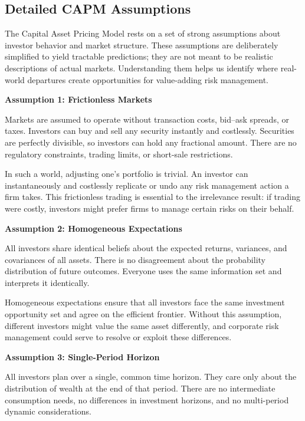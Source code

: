 \documentclass[11pt,openany]{book}
\begin{document}
\subsection{Detailed CAPM Assumptions}\label{detailed-capm-assumptions}

The Capital Asset Pricing Model rests on a set of strong assumptions about investor behavior and market structure. These assumptions are deliberately simplified to yield tractable predictions; they are not meant to be realistic descriptions of actual markets. Understanding them helps us identify where real-world departures create opportunities for value-adding risk management.

\textbf{Assumption 1: Frictionless Markets}

Markets are assumed to operate without transaction costs, bid--ask spreads, or taxes. Investors can buy and sell any security instantly and costlessly. Securities are perfectly divisible, so investors can hold any fractional amount. There are no regulatory constraints, trading limits, or short-sale restrictions.

In such a world, adjusting one's portfolio is trivial. An investor can instantaneously and costlessly replicate or undo any risk management action a firm takes. This frictionless trading is essential to the irrelevance result: if trading were costly, investors might prefer firms to manage certain risks on their behalf.

\textbf{Assumption 2: Homogeneous Expectations}

All investors share identical beliefs about the expected returns, variances, and covariances of all assets. There is no disagreement about the probability distribution of future outcomes. Everyone uses the same information set and interprets it identically.

Homogeneous expectations ensure that all investors face the same investment opportunity set and agree on the efficient frontier. Without this assumption, different investors might value the same asset differently, and corporate risk management could serve to resolve or exploit these differences.

\textbf{Assumption 3: Single-Period Horizon}

All investors plan over a single, common time horizon. They care only about the distribution of wealth at the end of that period. There are no intermediate consumption needs, no differences in investment horizons, and no multi-period dynamic considerations.
\end{document}
